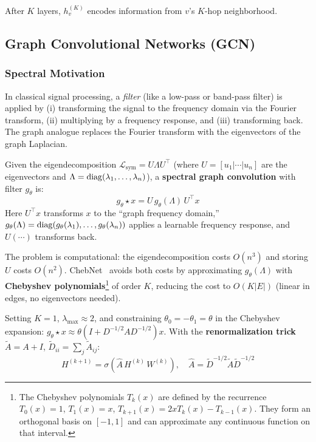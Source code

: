 \begin{notechapter}
After $K$ layers, $h_v^{(K)}$ encodes information from $v$'s $K$-hop
neighborhood.

\subsection{Graph Convolutional Networks (GCN)}

\subsubsection{Spectral Motivation}

In classical signal processing, a \emph{filter} (like a low-pass or band-pass
filter) is applied by (i) transforming the signal to the frequency domain via
the Fourier transform, (ii) multiplying by a frequency response, and
(iii) transforming back. The graph analogue replaces the Fourier transform
with the eigenvectors of the graph Laplacian.

\begin{definition}
Given the eigendecomposition $\mathcal{L}_{\mathrm{sym}} = U\Lambda U^\top$
(where $U = [u_1|\cdots|u_n]$ are the eigenvectors and
$\Lambda = \operatorname{diag}(\lambda_1, \ldots, \lambda_n)$), a
\textbf{spectral graph convolution} with filter $g_\theta$ is:
\begin{equation}
g_\theta \star x = U\,g_\theta(\Lambda)\,U^\top x
\end{equation}
Here $U^\top x$ transforms $x$ to the ``graph frequency domain,''
$g_\theta(\Lambda) = \operatorname{diag}(g_\theta(\lambda_1), \ldots, g_\theta(\lambda_n))$
applies a learnable frequency response, and $U(\cdots)$ transforms back.
\end{definition}

The problem is computational: the eigendecomposition costs $O(n^3)$ and storing
$U$ costs $O(n^2)$. ChebNet~\cite{semi-supervised-graphs:defferrard2016} avoids both costs by
approximating $g_\theta(\Lambda)$ with \textbf{Chebyshev polynomials}\footnote{
The Chebyshev polynomials $T_k(x)$ are defined by the recurrence
$T_0(x) = 1$, $T_1(x) = x$, $T_{k+1}(x) = 2xT_k(x) - T_{k-1}(x)$. They form an
orthogonal basis on $[-1,1]$ and can approximate any continuous function on
that interval.} of order $K$, reducing the cost to $O(K|E|)$ (linear in edges,
no eigenvectors needed).

\begin{theorem}
\label{semi-supervised-graphs:thm:gcn}
Setting $K=1$, $\lambda_{\max} \approx 2$, and constraining $\theta_0 = 
-\theta_1 = \theta$ in the Chebyshev expansion:
$g_\theta \star x \approx \theta(I + D^{-1/2}AD^{-1/2})x$. With the
\textbf{renormalization trick} $\tilde{A} = A + I$,
$\tilde{D}_{ii} = \sum_j \tilde{A}_{ij}$:
\begin{equation}
\boxed{H^{(k+1)} = \sigma(\hat{A}\,H^{(k)}\,W^{(k)})}, \quad
\hat{A} = \tilde{D}^{-1/2}\tilde{A}\tilde{D}^{-1/2}
\end{equation}
\end{theorem}


\end{notechapter}
